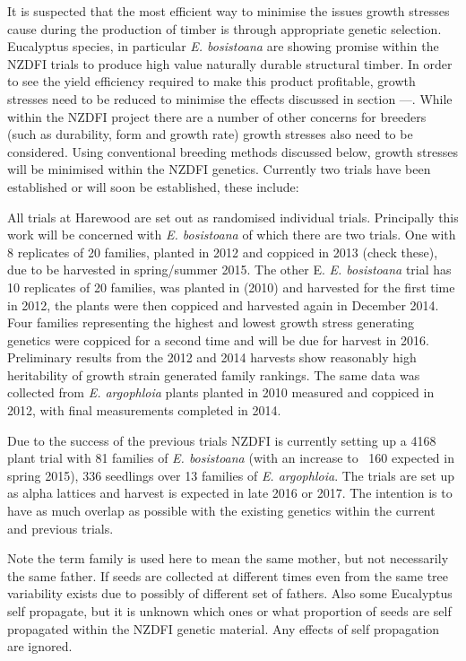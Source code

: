 \documentclass{article}
\begin{document}
It is suspected that the most efficient way to minimise the issues growth
stresses cause during the production of timber is through appropriate genetic
selection. Eucalyptus species, in particular \textit{E. bosistoana} are showing
promise within the NZDFI trials to produce high value naturally durable
structural timber. In order to see the yield efficiency required to make this
product profitable, growth stresses need to be reduced to minimise the effects
discussed in section ---. While within the NZDFI project there are a number of
other concerns for breeders (such as durability, form and growth rate) growth
stresses also need to be considered. Using conventional breeding methods
discussed below, growth stresses will be minimised within the NZDFI genetics.
Currently two trials have been established or will soon be established, these
include:

All trials at Harewood are set out as randomised individual trials. Principally
this work will be concerned with \textit{E. bosistoana} of which there  are two
trials. One with 8 replicates of 20 families, planted in 2012 and coppiced in
2013 (check these), due to be harvested in spring/summer 2015. The other E.
\textit{E. bosistoana} trial has 10 replicates of 20 families, was planted in
(2010) and harvested for the first time in 2012, the plants were then coppiced
and harvested again in December 2014. Four families representing the highest and
lowest growth stress generating genetics were coppiced for a second time and
will be due for harvest in 2016. Preliminary results from the 2012 and 2014
harvests show reasonably high heritability of growth strain generated family
rankings. The same data was collected from \textit{E. argophloia} plants planted
in 2010 measured and coppiced in 2012, with final measurements completed in 2014.

Due to the success of the previous trials NZDFI is currently setting up a 4168
plant trial with 81 families of \textit{E. bosistoana} (with an increase to ~160
expected in spring 2015), 336 seedlings over 13 families of \textit{E.
argophloia}. The trials are set up as alpha lattices and harvest is expected in
late 2016 or 2017. The intention is to have as much overlap as possible with the
existing genetics within the current and previous trials.

Note the term family is used here to mean the same mother, but not necessarily
the same father. If seeds are collected at different times even from the same
tree variability exists due to possibly of different set of fathers. Also some
Eucalyptus self propagate, but it is unknown which ones or what proportion of
seeds are self propagated within the NZDFI genetic material. Any effects of self
propagation are ignored.
\end{document}
